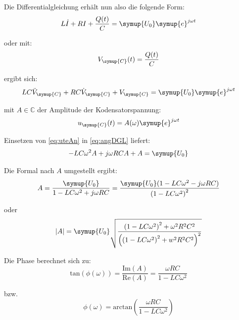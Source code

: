     \noindent Die Differentialgleichung erhält nun also die folgende Form:
    \begin{equation}
        L \dot{I} + R I + \frac{Q(t)}{C} = \symup{U_0} \symup{e}^{j \omega t} \nonumber
    \end{equation}

    \noindent oder mit:
    \begin{equation}
        V_{\symup{C}} (t) = \frac{Q(t)}{C} \nonumber
    \end{equation}

    \noindent ergibt sich:
    \begin{equation}
        LC \ddot{V}_{\symup{C}} + RC \dot{V}_{\symup{C}} + V_{\symup{C}} = \symup{U_0} \symup{e}^{j \omega t} 
        \label{eq:angDGL}
    \end{equation}

    \noindent mit $A \in  \mathds{C}$ der Amplitude der Kodensatorspannung:
    \begin{equation}
        u_{\symup{C}} (t) = A(\omega) \symup{e}^{j \omega t} 
        \label{eq:uteAn}
    \end{equation}

    \noindent Einsetzen von \ref{eq:uteAn} in \ref{eq:angDGL} liefert:
    \begin{equation}
        -LC \omega^2 A + j\omega RC A +A = \symup{U_0} \nonumber
    \end{equation}

    \noindent Die Formal nach $A$ umgestellt ergibt:
    \begin{equation}
        A= \frac{\symup{U_0}}{1 - LC \omega^2 + j \omega RC} = \frac{ \symup{U_0}(1 -LC \omega^2 - j\omega RC)}{\left( 1- LC \omega^2 \right)^2} \nonumber
    \end{equation}
    
    \noindent oder
    \begin{equation}
        |A|= \symup{U_0} \sqrt{\frac{\left(1-LC\omega^2\right)^2 + \omega^2 R^2C^2}{\left( \left(1 -LC \omega^2\right)^2 +w^2R^2C^2 \right)^2}}
        \label{eq:betA}
    \end{equation}

    \noindent Die Phase berechnet sich zu:
    \begin{equation}
        \text{tan}(\phi (\omega)) = \frac{\text{Im}(A)}{\text{Re}(A)} = \frac{\omega RC}{1 - LC\omega^2} \nonumber
    \end{equation}

    \noindent bzw.
    \begin{equation}
        \phi (\omega) = \text{arctan}\left(\frac{\omega RC}{1 - LC\omega^2} \right)
        \label{eq:phi}
    \end{equation}

